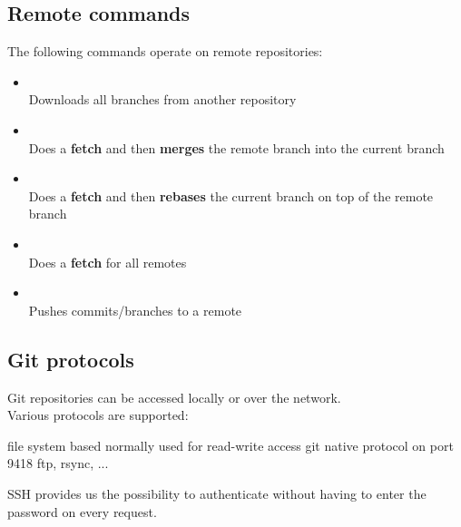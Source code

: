 \subsection{Remote commands}
\begin{frame}[fragile]
  \subslidetitle
  The following commands operate on remote repositories:
  \begin{itemize}
    \item {} \\
      Downloads all branches from another repository
    \item {} \\
      Does a {\bf fetch} and then {\bf merges} the remote branch into the current branch
    \item {} \\
      Does a {\bf fetch} and then {\bf rebases} the current branch on top of the remote branch
    \item {} \\
      Does a {\bf fetch} for all remotes
    \item {} \\
      Pushes commits/branches to a remote
  \end{itemize}
\end{frame}

\subsection{Git protocols}
\begin{frame}[fragile]
  \subslidetitle
  Git repositories can be accessed locally or over the network.
  \\
  \vspace{1em}
  Various protocols are supported:
  \begin{itemize}
    {file system based}
      {normally used for read-write access}
      {git native protocol on port 9418}
   {ftp, rsync, ...}
  \end{itemize}
  \vspace{1em}

  SSH provides us the possibility to authenticate without having to enter the password on every request.
\end{frame}

